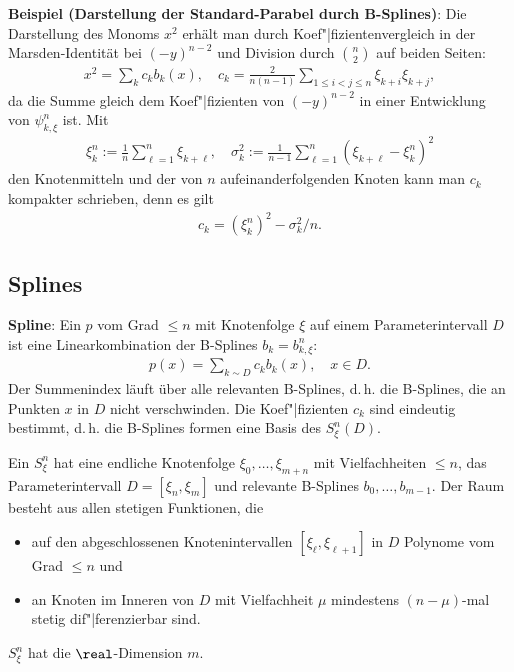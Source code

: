 \linie

\textbf{Beispiel (Darstellung der Standard-Parabel durch B-Splines)}:
Die Darstellung des Monoms $x^2$ erhält man durch Koef"|fizientenvergleich in der Marsden-Identität
bei $(-y)^{n-2}$ und Division durch $\binom{n}{2}$ auf beiden Seiten:
\begin{align*}
    x^2 = \sum_k c_k b_k(x),\quad
    c_k = \frac{2}{n(n - 1)} \sum_{1 \le i < j \le n} \xi_{k+i}\xi_{k+j},
\end{align*}
da die Summe gleich dem Koef"|fizienten von $(-y)^{n-2}$ in einer Entwicklung von $\psi_{k,\xi}^n$
ist.
Mit
\begin{align*}
    \xi_k^n := \frac{1}{n} \sum_{\ell=1}^n \xi_{k+\ell},\quad
    \sigma_k^2 := \frac{1}{n - 1} \sum_{\ell=1}^n (\xi_{k+\ell} - \xi_k^n)^2
\end{align*}
den Knotenmitteln und der  von $n$ aufeinanderfolgenden Knoten kann
man $c_k$ kompakter schrieben, denn es gilt
\begin{align*}
    c_k = (\xi_k^n)^2 - \sigma_k^2/n.
\end{align*}

\subsection{%
    Splines%
}

\textbf{Spline}:
Ein  $p$ vom Grad $\le n$ mit Knotenfolge $\xi$ auf einem Parameterintervall $D$
ist eine Linearkombination der B-Splines $b_k = b_{k,\xi}^n$:
\begin{align*}
    p(x) = \sum_{k \sim D} c_k b_k(x),\quad
    x \in D.
\end{align*}
Der Summenindex läuft über alle relevanten B-Splines, d.\,h. die B-Splines, die an Punkten $x$ in
$D$ nicht verschwinden.
Die Koef"|fizienten $c_k$ sind eindeutig bestimmt, d.\,h. die B-Splines formen eine Basis des
 $S_\xi^n(D)$.

Ein  $S_\xi^n$ hat eine endliche Knotenfolge
$\xi_0, \dotsc, \xi_{m+n}$ mit Vielfachheiten $\le n$, das Parameterintervall $D = [\xi_n, \xi_m]$
und relevante B-Splines $b_0, \dotsc, b_{m-1}$.
Der Raum besteht aus allen stetigen Funktionen, die
\begin{itemize}
    \item
    auf den abgeschlossenen Knotenintervallen $[\xi_\ell, \xi_{\ell+1}]$ in $D$
    Polynome vom Grad $\le n$ und

    \item
    an Knoten im Inneren von $D$ mit Vielfachheit $\mu$
    mindestens $(n - \mu)$-mal stetig dif"|ferenzierbar sind.
\end{itemize}
$S_\xi^n$ hat die $\real$-Dimension $m$.

